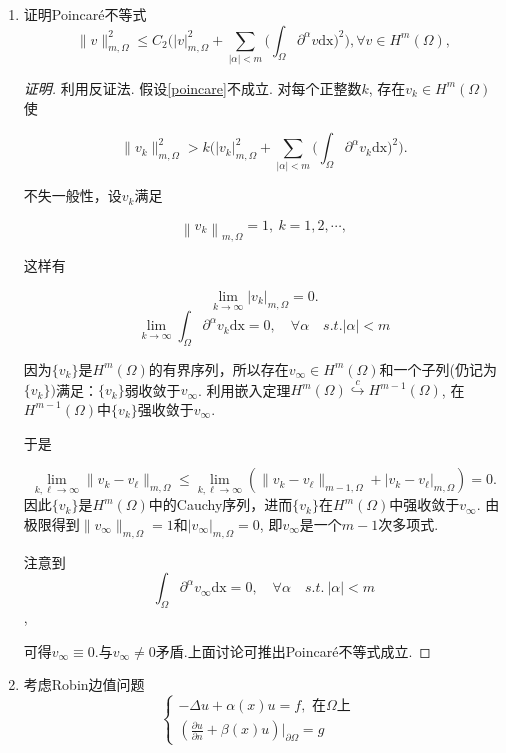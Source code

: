 \documentclass[12pt,a4paper]{article}
\begin{document}
\begin{enumerate}
		\item 证明Poincaré不等式
		\begin{equation}
			\|v\|_{m,\Omega}^2\leq C_2\Big(|v|_{m,\Omega}^2+\sum_{|\alpha|<m}\Big(\int_\Omega\partial^\alpha v\mathrm{dx}\Big)^2\Big),\forall v\in H^m(\Omega),\label{poincare}
		\end{equation}
		
		\begin{proof}[证明]
			利用反证法. 假设\eqref{poincare}不成立. 对每个正整数$k$, 存在$v_k\in H^m(\Omega)$使
			
			$$
			\|v_k\|^2_{m,\Omega}>k\Big(|v_k|_{m,\Omega}^2+\sum_{|\alpha|<m}\Big(\int_\Omega\partial^\alpha v_k\mathrm{dx}\Big)^2\Big).
			$$
			
			不失一般性，设$v_k$满足
			
			$$
			\left\|v_k\right\|_{m,\Omega}=1,\:k=1,2,\cdots,
			$$
			
			这样有
			
			$$
			\lim_{k\to\infty}|v_k|_{m,\Omega}=0.
			$$
			$$
			\lim_{k\to\infty}\int_\Omega\partial^\alpha v_k\mathrm{dx} = 0, \quad \forall \alpha \quad s.t. |\alpha|<m
			$$
			
			因为$\{v_k\}$是$H^m(\Omega)$的有界序列，所以存在$v_\infty\in H^m(\Omega)$和一个子列(仍记为$\{v_k\})$满足：$\{v_k\}$弱收敛于$v_\infty$. 利用嵌入定理$H^m(\Omega)\overset{c}{\operatorname*{\hookrightarrow}}H^{m-1}(\Omega)$,
			在$H^{m-1}(\Omega)$中$\{v_k\}$强收敛于$v_{\infty}.$
			
			于是
			
			$$
			\lim_{k,\ell\to\infty}\|v_k-v_\ell\|_{m,\Omega}\leq\lim_{k,\ell\to\infty}\left(\|v_k-v_\ell\|_{m-1,\Omega}+|v_k-v_\ell|_{m,\Omega}\right)=0.
			$$
			因此$\{v_k\}$是$H^m(\Omega)$中的Cauchy序列，进而$\{v_k\}$在$H^m(\Omega)$中强收敛于$v_\infty.$ 由极限得到$\|v_\infty\|_{m,\Omega}=1$和$|v_\infty|_{m,\Omega}=0$, 即$v_{\infty}$是一个$m-1$次多项式. 
			
			注意到
			$$
			\int_\Omega\partial^\alpha v_\infty \mathrm{dx} = 0, \quad \forall \alpha \quad s.t. \ |\alpha|<m
			$$,
			
			可得$v_\infty\equiv0$.与$v_\infty\neq0$矛盾.上面讨论可推出Poincaré不等式成立.
			
			
		\end{proof}
		
		\item 考虑Robin边值问题
		\begin{equation}
			\begin{cases}-\Delta u+\alpha(x)u=f,\text{ 在}\Omega \text{上}\\(\frac{\partial u}{\partial n}+\beta(x)u)\left.\right|_{\partial\Omega}=g&\end{cases}
			\label{robin}
		\end{equation}
		

\end{enumerate}
\end{document}

